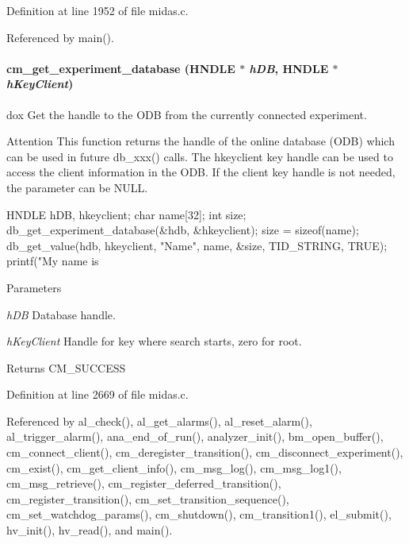 Definition at line 1952 of file midas.c.

Referenced by main().
\paragraph[{cm\_\-get\_\-experiment\_\-database}]{ cm\_\-get\_\-experiment\_\-database (HNDLE $\ast$ {\em hDB}, \/  HNDLE $\ast$ {\em hKeyClient})}\hfill\label{group__cmfunctionc_ga16b33b70783a3f5ba98b4094149d12b7}
dox Get the handle to the ODB from the currently connected experiment.

\begin{DoxyAttention}{Attention}
This function returns the handle of the online database (ODB) which can be used in future db\_\-xxx() calls. The hkeyclient key handle can be used to access the client information in the ODB. If the client key handle is not needed, the parameter can be NULL. 
\begin{DoxyCode}
HNDLE hDB, hkeyclient;
 char  name[32];
 int   size;
 db_get_experiment_database(&hdb, &hkeyclient);
 size = sizeof(name);
 db_get_value(hdb, hkeyclient, "Name", name, &size, TID_STRING, TRUE);
 printf("My name is %
\end{DoxyCode}
 
\end{DoxyAttention}

\begin{DoxyParams}{Parameters}
\item[{\em hDB}]Database handle. \item[{\em hKeyClient}]Handle for key where search starts, zero for root. \end{DoxyParams}
\begin{DoxyReturn}{Returns}
CM\_\-SUCCESS 
\end{DoxyReturn}


Definition at line 2669 of file midas.c.

Referenced by al\_\-check(), al\_\-get\_\-alarms(), al\_\-reset\_\-alarm(), al\_\-trigger\_\-alarm(), ana\_\-end\_\-of\_\-run(), analyzer\_\-init(), bm\_\-open\_\-buffer(), cm\_\-connect\_\-client(), cm\_\-deregister\_\-transition(), cm\_\-disconnect\_\-experiment(), cm\_\-exist(), cm\_\-get\_\-client\_\-info(), cm\_\-msg\_\-log(), cm\_\-msg\_\-log1(), cm\_\-msg\_\-retrieve(), cm\_\-register\_\-deferred\_\-transition(), cm\_\-register\_\-transition(), cm\_\-set\_\-transition\_\-sequence(), cm\_\-set\_\-watchdog\_\-params(), cm\_\-shutdown(), cm\_\-transition1(), el\_\-submit(), hv\_\-init(), hv\_\-read(), and main().
